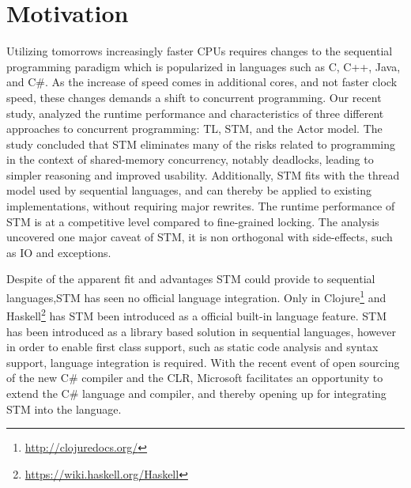 \makeatletter {}\makeatother
{}
%
\section{Motivation}
Utilizing tomorrows increasingly faster \acp{CPU} requires changes to the sequential programming paradigm which is popularized in languages such as C, C++, Java, and C\#. As the increase of speed comes in additional cores, and not faster clock speed\cite{sutter2005free}, these changes demands a shift to concurrent programming. Our recent study\cite{dpt907e14trending}, analyzed the runtime performance and characteristics of three different approaches to concurrent programming: \ac{TL}, \ac{STM}, and the Actor model. The study concluded that \ac{STM} eliminates many of the risks related to programming in the context of shared-memory concurrency, notably deadlocks, leading to simpler reasoning and improved usability. Additionally, \ac{STM} fits with the thread model used by sequential languages, and can thereby be applied to existing implementations, without requiring major rewrites. The runtime performance of \ac{STM} is at a competitive level compared to fine-grained locking\cite{dpt907e14trending}. The analysis uncovered one major caveat of \ac{STM}, it is non orthogonal with side-effects, such as \ac{IO} and exceptions\cite{dpt907e14trending}.

Despite of the apparent fit and advantages \ac{STM} could provide to sequential languages,\ac{STM} has seen no official language integration. Only in Clojure\footnote{\url{http://clojuredocs.org/}} and Haskell\footnote{\url{https://wiki.haskell.org/Haskell}} has \ac{STM} been introduced as a official built-in language feature. \ac{STM} has been introduced as a library based solution in sequential languages, however in order to enable first class support, such as static code analysis and syntax support, language integration is required. With the recent event of open sourcing of the new C\# compiler\cite{roslyn}  and the \ac{CLR}\cite{coreclr}, Microsoft facilitates an opportunity to extend the C\# language and compiler, and thereby opening up for integrating \ac{STM} into the language.
